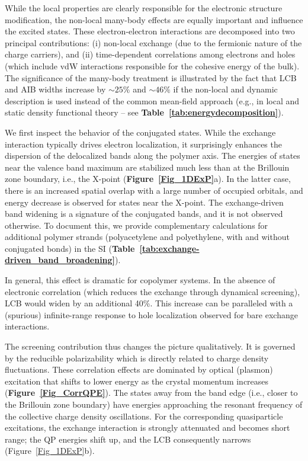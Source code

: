 \documentclass[journal = jpclcd]{achemso}
\begin{document}
While the local properties are clearly responsible for the electronic structure modification, the non-local many-body effects are equally important and influence the excited states. These electron-electron interactions are decomposed into two principal contributions: (i) non-local exchange (due to the fermionic nature of the charge carriers), and (ii) time-dependent correlations among electrons and holes (which include vdW interactions responsible for the cohesive energy of the bulk).
The significance of the many-body treatment is illustrated by  the fact that LCB and AIB widths increase by $\sim 25\%$ and $\sim 46\%$  if the non-local and dynamic description is used instead of the common mean-field approach (e.g., in local and static density functional theory -- see \textbf{Table~\ref{tab:energydecomposition}}). 

We first inspect the behavior of the conjugated states. While the exchange interaction typically drives electron localization,\cite{Sanchez2008} it surprisingly enhances the dispersion of the delocalized bands along the polymer axis. The energies of states near the valence band maximum are stabilized much less than at the Brillouin zone boundary,  i.e., the X-point (\textbf{Figure~\ref{Fig_1DExP}}a). In the latter case, there is an increased spatial overlap with a large number of occupied orbitals, and energy decrease is observed for states near the X-point. The exchange-driven band widening is a signature of the conjugated bands, and it is not observed otherwise. To document this, we provide complementary calculations for additional polymer strands (polyacetylene and polyethylene, with and without conjugated bonds) in the SI (\textbf{Table~\ref{tab:exchange-driven_band_broadening}}). 

In general, this effect is dramatic for copolymer systems. In the absence of electronic correlation (which reduces the exchange through dynamical screening), LCB would widen by an additional 40\%. This increase can be paralleled with a (spurious) infinite-range response to hole localization observed for bare exchange interactions.\cite{Vlcek2016}

The screening contribution thus changes the picture qualitatively. It is governed by the reducible polarizability which is directly related to charge density fluctuations.\cite{martin_reining_ceperley_2016}
These correlation effects are dominated by optical (plasmon) excitation that shifts to lower energy as the crystal momentum increases (\textbf{Figure~\ref{Fig_CorrQPE}}). The states away from the band edge (i.e., closer to the Brillouin zone boundary) have energies approaching the resonant frequency of the collective charge density oscillations.  For the corresponding quasiparticle excitations, the exchange interaction is strongly attenuated and becomes short range; the QP energies shift up, and the LCB consequently narrows (Figure~\ref{Fig_1DExP}b).
\end{document}
